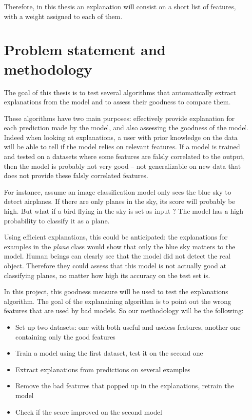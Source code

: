 \documentclass[a4paper,11pt]{kth-mag}
\begin{document}
Therefore, in this thesis an explanation will consist on a short list of features, with a weight assigned to each of them.

\section{Problem statement and methodology}

The goal of this thesis is to test several algorithms that automatically extract explanations from the model and to assess their goodness to compare them.

These algorithms have two main purposes: effectively provide explanation for each prediction made by the model, and also assessing the goodness of the model. Indeed when looking at explanations, a user with prior knowledge on the data will be able to tell if the model relies on relevant features. If a model is trained and tested on a datasets where some features are falsly correlated to the output, then the model is probably not very good -- not generalizable on new data that does not provide these falsly correlated features.

For instance, assume an image classification model only sees the blue sky to detect airplanes. If there are only planes in the sky, its score will probably be high. But what if a bird flying in the sky is set as input ? The model has a high probability to classify it as a plane.

Using efficient explanations, this could be anticipated: the explanations for examples in the \textit{plane} class would show that only the blue sky matters to the model. Human beings can clearly see that the model did not detect the real object. Therefore they could assess that this model is not actually good at classifying planes, no matter how high its accuracy on the test set is.

In this project, this goodness measure will be used to test the explanations algorithm. The goal of the explanaining algorithm is to point out the wrong features that are used by bad models. So our methodology will be the following:

\begin{itemize}
	\item Set up two datasets: one with both useful and useless features, another one containing only the good features
	\item Train a model using the first dataset, test it on the second one
	\item Extract explanations from predictions on several examples
	\item Remove the bad features that popped up in the explanations, retrain the model
	\item Check if the score improved on the second model
\end{itemize}
\end{document}
